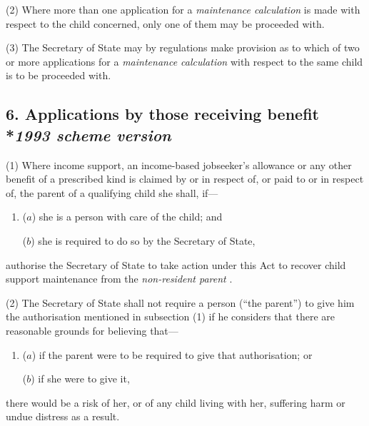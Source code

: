 \documentclass[12pt,a4paper]{article}
\begin{document}
(2) Where more than one application for a 
\emph{maintenance calculation}  %
is made with respect to the child concerned, only one of them may be proceeded with.

(3) The Secretary of State may by regulations make provision as to which of two or more applications for a 
\emph{maintenance calculation}  %
with respect to the same child is to be proceeded with.


\subsection[6. Applications by those receiving benefit --- \emph{1993 scheme version}]{6. Applications by those receiving benefit\\*\emph{1993 scheme version}}

(1) Where income support, 
an income-based jobseeker’s allowance  %
or any other benefit of a prescribed kind is claimed by or in respect of, or paid to or in respect of, the parent of a qualifying child she shall, if—
\begin{enumerate}\item[]
($a$) she is a person with care of the child; and

($b$) she is required to do so by the Secretary of State,
\end{enumerate}
authorise the Secretary of State to take action under this Act to recover child support maintenance from the 
\emph{non-resident parent}%
.

(2) The Secretary of State shall not require a person (“the parent”) to give him the authorisation mentioned in subsection (1)  if he considers that there are reasonable grounds for believing that—
\begin{enumerate}\item[]
($a$) if the parent were to be required to give that authorisation; or

($b$) if she were to give it,
\end{enumerate}
there would be a risk of her, or of any child living with her, suffering harm or undue distress as a result.
\end{document}
